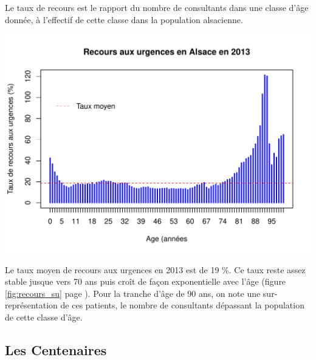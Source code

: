 \documentclass[12pt,english,french,twoside]{book}\usepackage[]{graphicx}\usepackage[]{color}
\makeatletter
\def\maxwidth{ %
  \ifdim\Gin@nat@width>\linewidth
    \linewidth
  \else
    \Gin@nat@width
  \fi
}
\newenvironment{knitrout}{}{} %
\makeatother
\begin{document}
Le taux de recours est le rapport du nombre de consultants dans une classe d'âge donnée, à l'effectif de cette classe dans la population alsacienne.

\begin{center}
\begin{knitrout}
\color{fgcolor}
\includegraphics[width=\maxwidth]{figure/alsace_recours} 

\end{knitrout}

\label{fig:recours_su}
\end{center}


Le taux moyen de recours aux urgences en 2013 est de 19 \%. Ce taux reste assez stable jusque vers 70 ans puis croît de façon exponentielle avec l'âge (figure \ref{fig:recours_su} page \pageref{fig:recours_su}). Pour la tranche d'âge de 90 ans, on note une sur-représentation de ces patients, le nombre de consultants dépassant la population de cette classe d'âge.

\subsection*{Les Centenaires}
\label{centenaires}
\end{document}
